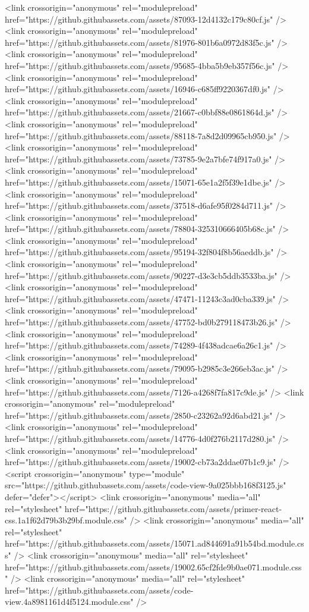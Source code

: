 <link crossorigin="anonymous" rel="modulepreload" href="https://github.githubassets.com/assets/87093-12d4132c179c80cf.js" />
<link crossorigin="anonymous" rel="modulepreload" href="https://github.githubassets.com/assets/81976-801b6a0972d83f5c.js" />
<link crossorigin="anonymous" rel="modulepreload" href="https://github.githubassets.com/assets/95685-4bba5b9eb357f56c.js" />
<link crossorigin="anonymous" rel="modulepreload" href="https://github.githubassets.com/assets/16946-c685ff9220367df0.js" />
<link crossorigin="anonymous" rel="modulepreload" href="https://github.githubassets.com/assets/21667-c0bbf88e0861864d.js" />
<link crossorigin="anonymous" rel="modulepreload" href="https://github.githubassets.com/assets/88118-7a8d2d09965cb950.js" />
<link crossorigin="anonymous" rel="modulepreload" href="https://github.githubassets.com/assets/73785-9e2a7bfe74f917a0.js" />
<link crossorigin="anonymous" rel="modulepreload" href="https://github.githubassets.com/assets/15071-65e1a2f5f39e1dbe.js" />
<link crossorigin="anonymous" rel="modulepreload" href="https://github.githubassets.com/assets/37518-d6afe95f0284d711.js" />
<link crossorigin="anonymous" rel="modulepreload" href="https://github.githubassets.com/assets/78804-325310666405b68c.js" />
<link crossorigin="anonymous" rel="modulepreload" href="https://github.githubassets.com/assets/95194-32f804f8b56aeddb.js" />
<link crossorigin="anonymous" rel="modulepreload" href="https://github.githubassets.com/assets/90227-d3e3cb5ddb3533ba.js" />
<link crossorigin="anonymous" rel="modulepreload" href="https://github.githubassets.com/assets/47471-11243c3ad0cba339.js" />
<link crossorigin="anonymous" rel="modulepreload" href="https://github.githubassets.com/assets/47752-bd0b279118473b26.js" />
<link crossorigin="anonymous" rel="modulepreload" href="https://github.githubassets.com/assets/74289-4f438adcae6a26c1.js" />
<link crossorigin="anonymous" rel="modulepreload" href="https://github.githubassets.com/assets/79095-b2985c3e266eb3ac.js" />
<link crossorigin="anonymous" rel="modulepreload" href="https://github.githubassets.com/assets/7126-a4268f7fa817c9de.js" />
<link crossorigin="anonymous" rel="modulepreload" href="https://github.githubassets.com/assets/2850-c23262a92d6abd21.js" />
<link crossorigin="anonymous" rel="modulepreload" href="https://github.githubassets.com/assets/14776-4d0f276b2117d280.js" />
<link crossorigin="anonymous" rel="modulepreload" href="https://github.githubassets.com/assets/19002-cb73a2ddae07b1c9.js" />
<script crossorigin="anonymous" type="module" src="https://github.githubassets.com/assets/code-view-9a025bbb168f3125.js" defer="defer"></script>
<link crossorigin="anonymous" media="all" rel="stylesheet" href="https://github.githubassets.com/assets/primer-react-css.1a1f62d79b3b29bf.module.css" />
<link crossorigin="anonymous" media="all" rel="stylesheet" href="https://github.githubassets.com/assets/15071.ad844691a91b54bd.module.css" />
<link crossorigin="anonymous" media="all" rel="stylesheet" href="https://github.githubassets.com/assets/19002.65cf2fde9b0ae071.module.css" />
<link crossorigin="anonymous" media="all" rel="stylesheet" href="https://github.githubassets.com/assets/code-view.4a8981161d4f5124.module.css" />


